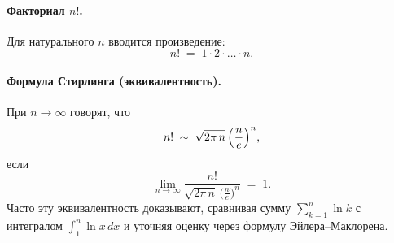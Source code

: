 
\paragraph{Факториал $n!$.}
Для натурального $n$ вводится произведение:
\[
	n! \;=\; 1\cdot 2\cdot \dots \cdot n.
\]

\bigskip

\paragraph{Формула Стирлинга (эквивалентность).}
При $n\to\infty$ говорят, что
\[
	n! \;\sim\;\sqrt{2\pi\,n}\,\Bigl(\frac{n}{e}\Bigr)^n,
\]
если
\[
	\lim_{n\to\infty} \frac{n!}{\sqrt{2\pi\,n}\,\bigl(\tfrac{n}{e}\bigr)^n} \;=\; 1.
\]
Часто эту эквивалентность доказывают, сравнивая сумму $\sum_{k=1}^n \ln k$
с интегралом $\int_{1}^{n}\ln x\,dx$ и уточняя оценку через формулу Эйлера–Маклорена.
